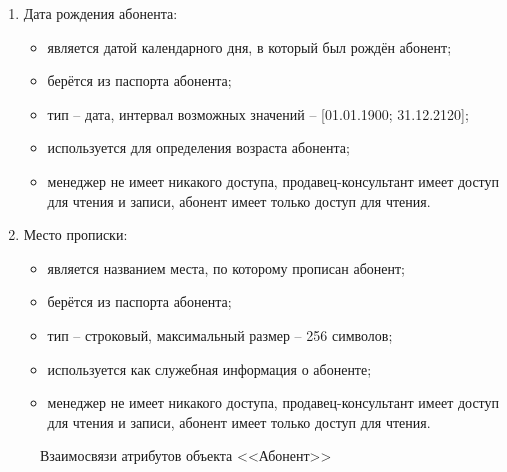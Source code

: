 \begin{enumerate}
\begin{enumerate}
        \item Дата рождения абонента:
        \begin{itemize}
            \item является датой календарного дня, в который был рождён абонент;
            \item берётся из паспорта абонента;
            \item тип -- дата, интервал возможных значений -- [01.01.1900; 31.12.2120];
            \item используется для определения возраста абонента;
            \item менеджер не имеет никакого доступа, продавец-консультант имеет доступ для чтения и записи, абонент имеет только доступ для чтения.
        \end{itemize}

        \item Место прописки:
        \begin{itemize}
            \item является названием места, по которому прописан абонент;
            \item берётся из паспорта абонента;
            \item тип -- строковый, максимальный размер -- 256 символов;
            \item используется как служебная информация о абоненте;
            \item менеджер не имеет никакого доступа, продавец-консультант имеет доступ для чтения и записи, абонент имеет только доступ для чтения.
        \end{itemize}
    \end{enumerate}
    \begin{figure}[H]
        \label{fig:subscriber-attributes}
        \caption{Взаимосвязи атрибутов объекта <<Абонент>>}
    \end{figure}


\end{enumerate}
